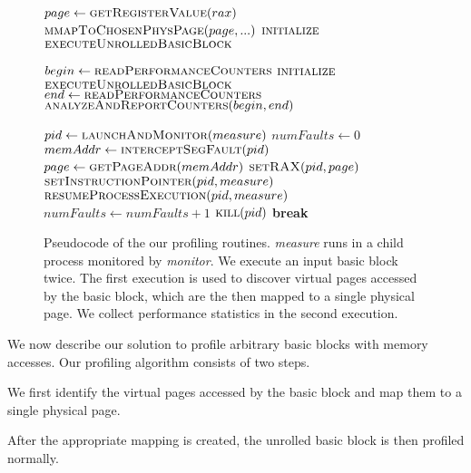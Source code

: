 \begin{figure}
\begin{algorithmic}

    \State $page \gets \Call{getRegisterValue}{rax}$
    \State $\Call{mmapToChosenPhysPage}{page, ...}$
    \State $\Call{initialize}{}$
    \State $\Call{executeUnrolledBasicBlock}{}$
    
    
    \State $begin \gets \Call{readPerformanceCounters}{}$
    \State $\Call{initialize}{}$
    \State $\Call{executeUnrolledBasicBlock}{}$
    \State $end \gets \Call{readPerformanceCounters}{}$
    \State $\Call{analyzeAndReportCounters}{begin, end}$
\EndFunction

    \State $pid \gets \Call{launchAndMonitor}{measure}$
    \State $numFaults \gets 0$
        \State $memAddr \gets \Call{interceptSegFault}{pid}$
            \State $page \gets \Call{getPageAddr}{memAddr}$
            \State $\Call{setRAX}{pid, page}$
            \State $\Call{setInstructionPointer}{pid, measure}$
            \State $\Call{resumeProcessExecution}{pid, measure}$
            \State $numFaults \gets numFaults + 1$
        \EndIf
            \State $\Call{kill}{pid}$
            \State \textbf{break}
        \EndIf
    \EndWhile
\EndFunction

\end{algorithmic}

\caption{Pseudocode of the our profiling routines. 
\textit{measure} runs in a child process monitored by
\textit{monitor}.
We execute an input basic block twice.
The first execution is used to discover virtual pages accessed
by the basic block, which are the then mapped to a single physical page.
We collect performance statistics in the second execution.}
\label{fig:code}
\end{figure}

We now describe our solution to profile arbitrary basic blocks with memory accesses.
Our profiling algorithm consists of two steps.
\begin{enumerate*}
\item We first identify the virtual pages accessed by
the basic block 
and map them to a single physical page.
\item After the appropriate mapping is created,
the unrolled basic block is then profiled normally.
\end{enumerate*}

